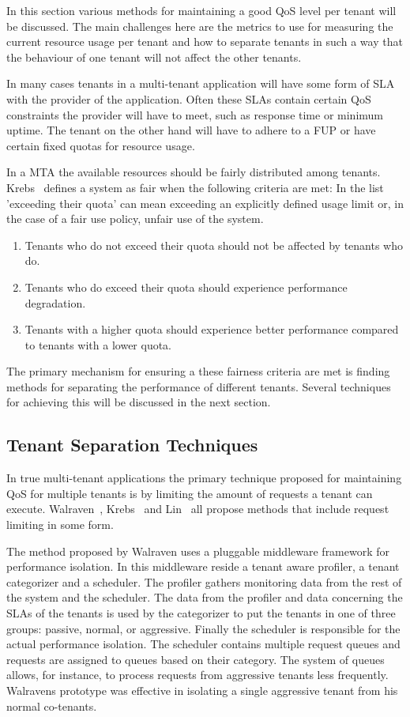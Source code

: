 In this section various methods for maintaining a good \ac{QoS} level per tenant will be discussed.
The main challenges here are the metrics to use for measuring the current resource usage per tenant and how to separate tenants in such a way that the behaviour of one tenant will not affect the other tenants.~\cite{krebs2013metrics}

In many cases tenants in a multi-tenant application will have some form of \ac{SLA} with the provider of the application.
Often these SLAs contain certain \ac{QoS} constraints the provider will have to meet, such as response time or minimum uptime. 
The tenant on the other hand will have to adhere to a \ac{FUP} or have certain fixed quotas for resource usage.

In a \ac{MTA} the available resources should be fairly distributed among tenants.
Krebs~\cite{krebs2013metrics} defines a system as fair when the following criteria are met:
In the list 'exceeding their quota' can mean exceeding an explicitly defined usage limit or, in the case of a fair use policy, unfair use of the system.
\begin{enumerate}
	\item Tenants who do not exceed their quota should not be affected by tenants who do.
	\item Tenants who do exceed their quota should experience performance degradation. 
	\item Tenants with a higher quota should experience better performance compared to tenants with a lower quota.
\end{enumerate}

The primary mechanism for ensuring a these fairness criteria are met is finding methods for separating the performance of different tenants.
Several techniques for achieving this will be discussed in the next section.

\subsection{Tenant Separation Techniques}
In true multi-tenant applications the primary technique proposed for maintaining \ac{QoS} for multiple tenants is by limiting the amount of requests a tenant can execute. Walraven~\cite{walraven2012towards}, Krebs~\cite{krebs2013metrics} and Lin~\cite{lin2009feedback} all propose methods that include request limiting in some form.

The method proposed by Walraven uses a pluggable middleware framework for performance isolation.
In this middleware reside a tenant aware profiler, a tenant categorizer and a scheduler. 
The profiler gathers monitoring data from the rest of the system and the scheduler.
The data from the profiler and data concerning the \acp{SLA} of the tenants is used by the categorizer to put the tenants in one of three groups: passive, normal, or aggressive.
Finally the scheduler is responsible for the actual performance isolation.
The scheduler contains multiple request queues and requests are assigned to queues based on their category.
The system of queues allows, for instance, to process requests from aggressive tenants less frequently.
Walravens prototype was effective in isolating a single aggressive tenant from his normal co-tenants.

